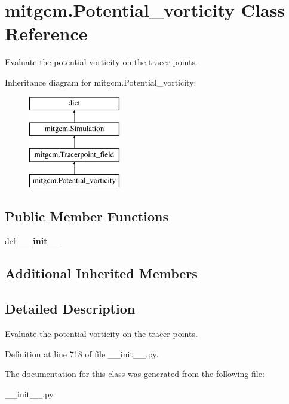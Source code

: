 \hypertarget{classmitgcm_1_1Potential__vorticity}{\section{mitgcm.\+Potential\+\_\+vorticity Class Reference}
\label{classmitgcm_1_1Potential__vorticity}
}


Evaluate the potential vorticity on the tracer points.  


Inheritance diagram for mitgcm.\+Potential\+\_\+vorticity\+:\begin{figure}[H]
\begin{center}
\leavevmode
\includegraphics[height=4.000000cm]{classmitgcm_1_1Potential__vorticity}
\end{center}
\end{figure}
\subsection*{Public Member Functions}
\begin{DoxyCompactItemize}
\item 
\hypertarget{classmitgcm_1_1Potential__vorticity_a5412ecfe6e02d7a6953cf8c2a7dab4cb}{def {\bfseries \+\_\+\+\_\+init\+\_\+\+\_\+}}\label{classmitgcm_1_1Potential__vorticity_a5412ecfe6e02d7a6953cf8c2a7dab4cb}

\end{DoxyCompactItemize}
\subsection*{Additional Inherited Members}


\subsection{Detailed Description}
Evaluate the potential vorticity on the tracer points. 



Definition at line 718 of file \+\_\+\+\_\+init\+\_\+\+\_\+.\+py.



The documentation for this class was generated from the following file\+:\begin{DoxyCompactItemize}
\item 
\+\_\+\+\_\+init\+\_\+\+\_\+.\+py\end{DoxyCompactItemize}
